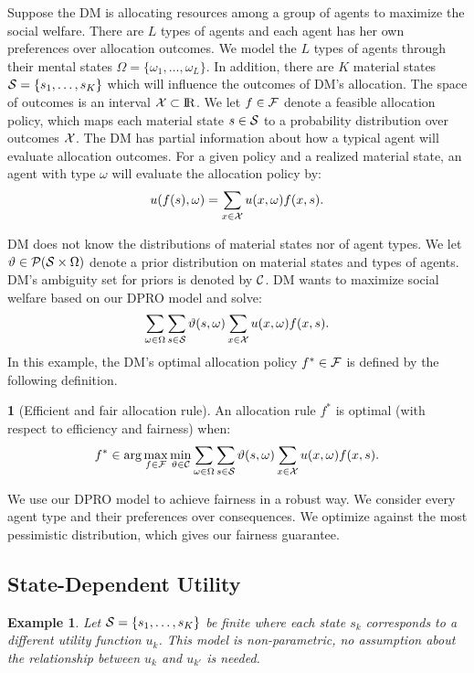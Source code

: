 \documentclass[11pt,oneside]{article}
\theoremstyle{plain}
\theoremstyle{plain}
\newtheorem{example}{Example}[section]
\theoremstyle{plain}
\theoremstyle{plain}
\theoremstyle{plain}
\theoremstyle{definition}
\newtheorem{defn}[thm]{\protect\definitionname}
\theoremstyle{definition}
\theoremstyle{remark}
\theoremstyle{plain}
\providecommand{\definitionname}{Definition}
\newcommand{\R}{{\rm I\!R}}
\newcommand{\F}{{\cal F}}
\newcommand{\mcs}{{\cal S}}
\newcommand{\mcx}{{\cal X}}
\begin{document}
Suppose the DM is allocating resources among a group of agents to maximize the social welfare.
There are $L$ types of agents and each agent has her own preferences over allocation outcomes.
We model the $L$ types of agents through their mental states $\Omega =\{ \omega_1,\ldots,\omega_L\}$. 
In addition, there are $K$ material states $\mcs = \{ s_1,\ldots,s_K\}$ which will influence the outcomes of DM's allocation. 
The space of outcomes is an interval $\mcx \subset \R$.
We let $f \in \F$ denote a feasible allocation policy, which maps each material state $s \in \mcs$ to a probability distribution over outcomes $\mcx$.
The DM has partial information about how a typical agent will evaluate allocation outcomes. For a given policy and a realized material state, an agent with type $\omega$ will evaluate the allocation policy by:
$$
u(f(s),\omega) = \sum_{x \in \mcx} u(x,\omega) f(x,s).
$$

DM does not know the distributions of material states nor of agent types. We let $\vartheta \in {\cal P}(\mcs \times \Omega)$ denote a prior distribution on material states and types of agents. DM's ambiguity set for priors is denoted by ${\cal C}$.
DM wants to maximize social welfare based on our DPRO model and solve:
$$
\sum_{\omega\in \Omega} \sum_{s\in \mcs} \vartheta(s,\omega) \sum_{x \in \mcx} u(x,\omega) f(x,s).
$$
In this example, the DM's optimal allocation policy $f^* \in \F$ is defined by the following definition.
\begin{defn}[Efficient and fair allocation rule]
An allocation rule $f^*$ is optimal (with respect to efficiency and fairness) when:
\begin{equation}
    \label{eq:optimal_allocation}
    f^* \in \arg \max\limits_{f \in \F} \min\limits_{\vartheta \in {\cal C}} \sum_{\omega\in \Omega} \sum_{s\in \mcs} \vartheta(s,\omega) \sum_{x \in \mcx} u(x,\omega) f(x,s).
\end{equation}
\end{defn}  

We use our DPRO model to achieve fairness in a robust way. We consider every agent type and their preferences over consequences. We optimize against the most pessimistic distribution, which gives our fairness guarantee.

\subsection{State-Dependent Utility}

\begin{example}
Let $\mcs = \{s_1, \ldots, s_K\}$ be finite where each state $s_k$ corresponds to a different utility function $u_k$. This model is non-parametric, no assumption about the relationship between $u_k$ and $u_{k'}$ is needed.
\end{example}
\end{document}
